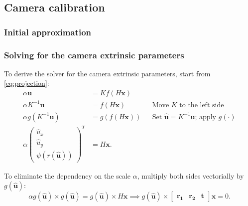 \documentclass[
  twocolumn,
]{article} %
\begin{document}
\subsection{Camera calibration}\label{sub:camera_calibration}

\subsubsection{Initial approximation}\label{subsub:initial_approximation}

\subsubsection{Solving for the camera extrinsic parameters}\label{ssub:solving_for_the_camera_extrinsic_parameters}

To derive the solver for the camera extrinsic parameters, start from
\cref{eq:projection}:
\begin{align}
	\alpha \mathbf{u}                                                          & = K f(H\mathbf{x})       \\
	\alpha K^{-1} \mathbf{u}                                                   & = f(H\mathbf{x})    &  &
	\text{Move \(K\) to the left side}                                                                    \\
	\alpha g( K^{-1}\mathbf{u})                                                & = g(f(H\mathbf{x})) &  &
	\text{Set \(\mathbf{\widehat{u}} = K^{-1}\mathbf{u}\); apply \(g(\cdot)\)}                            \\
	\alpha \begin{pmatrix}
		       \widehat{u}_x \\ \widehat{u}_y \\ \psi(r(\mathbf{\widehat{u}}))
	       \end{pmatrix}^{T} & = H\mathbf{x}.
\end{align}

To eliminate the dependency on the scale \(\alpha\), multiply both sides
vectorially by \(g(\mathbf{\widehat{u}})\):
\begin{equation}
	\alpha g(\mathbf{\widehat{u}}) \times g(\mathbf{\widehat{u}})
	= g(\mathbf{\widehat{u}}) \times H\mathbf{x} \implies
	g(\mathbf{\widehat{u}})
	\times \begin{bmatrix}
		\mathbf{r_1} & \mathbf{r_2} & \mathbf{t}
	\end{bmatrix} \mathbf{x} = 0
	\label{eq:eq_no_multiplier}.
\end{equation}
\end{document}
